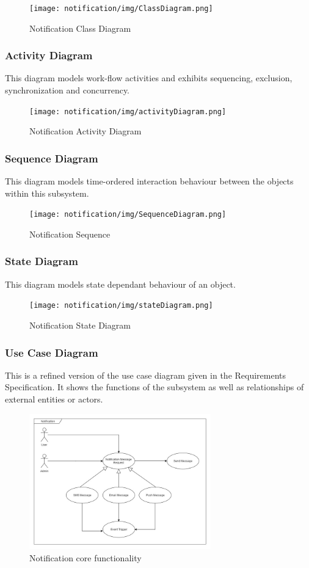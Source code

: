 \begin{figure}[H]
	\centering
	\texttt{[image: notification/img/ClassDiagram.png]}
	\caption{Notification Class Diagram}
\end{figure}

\newpage
\subsubsection{Activity Diagram}
This diagram models work-flow activities and exhibits sequencing, exclusion, synchronization and concurrency.
\begin{figure}[H]
	\centering
	\texttt{[image: notification/img/activityDiagram.png]}
	\caption{Notification Activity Diagram}
\end{figure}


\subsubsection{Sequence Diagram}
This diagram models time-ordered interaction behaviour between the objects within this subsystem.
\begin{figure}[H]
	\centering
	\texttt{[image: notification/img/SequenceDiagram.png]}
	\caption{Notification Sequence}
\end{figure}

\newpage
\subsubsection{State Diagram}
This diagram models state dependant behaviour of an object.
\begin{figure}[H]
	\centering
	\texttt{[image: notification/img/stateDiagram.png]}
	\caption{Notification State Diagram}
\end{figure}




\subsubsection{Use Case Diagram}
This is a refined version of the use case diagram given in the Requirements Specification. It shows the functions of the subsystem as well as relationships of external entities or actors.
\begin{figure}[H]
	\centering
	\includegraphics[width=0.7\textwidth]{notification/img/NotificationUseCase.jpg}
	\caption{Notification core functionality }
\end{figure}
